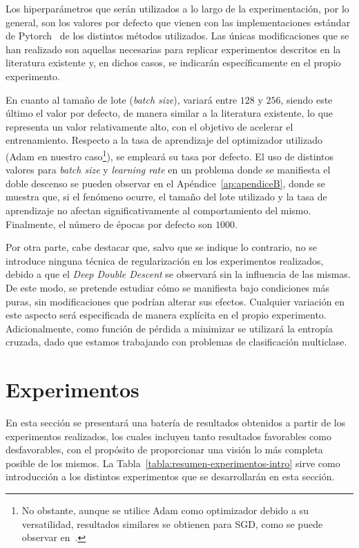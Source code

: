 Los hiperparámetros que serán utilizados a lo largo de la experimentación, por lo general, son los valores por defecto que vienen con las implementaciones estándar de Pytorch~\cite{NEURIPS2019_9015} de los distintos métodos utilizados. Las únicas modificaciones que se han realizado son aquellas necesarias para replicar experimentos descritos en la literatura existente y, en dichos casos, se indicarán específicamente en el propio experimento.

En cuanto al tamaño de lote (\textit{batch size}), variará entre $128$ y $256$, siendo este último el valor por defecto, de manera similar a la literatura existente, lo que representa un valor relativamente alto, con el objetivo de acelerar el entrenamiento. Respecto a la tasa de aprendizaje del optimizador utilizado (Adam en nuestro caso\footnote{No obstante, aunque se utilice Adam como optimizador debido a su versatilidad, resultados similares se obtienen para SGD, como se puede observar en~\cite{Nakkiran2019}.}), se empleará su tasa por defecto. El uso de distintos valores para \textit{batch size} y \textit{learning rate} en un problema donde se manifiesta el doble descenso se pueden observar en el Apéndice~\ref{ap:apendiceB}, donde se muestra que, si el fenómeno ocurre, el tamaño del lote utilizado y la tasa de aprendizaje no afectan significativamente al comportamiento del mismo. Finalmente, el número de épocas por defecto son $1000$.

Por otra parte, cabe destacar que, salvo que se indique lo contrario, no se introduce ninguna técnica de regularización en los experimentos realizados, debido a que el \textit{Deep Double Descent} se observará sin la influencia de las mismas. De este modo, se pretende estudiar cómo se manifiesta bajo condiciones más puras, sin modificaciones que podrían alterar sus efectos. Cualquier variación en este aspecto será especificada de manera explícita en el propio experimento. Adicionalmente, como función de pérdida a minimizar se utilizará la entropía cruzada, dado que estamos trabajando con problemas de clasificación multiclase.

\section{Experimentos}\label{sec:experimentos}

En esta sección se presentará una batería de resultados obtenidos a partir de los experimentos realizados, los cuales incluyen tanto resultados favorables como desfavorables, con el propósito de proporcionar una visión lo más completa posible de los mismos. La Tabla~\ref{tabla:resumen-experimentos-intro} sirve como introducción a los distintos experimentos que se desarrollarán en esta sección.


